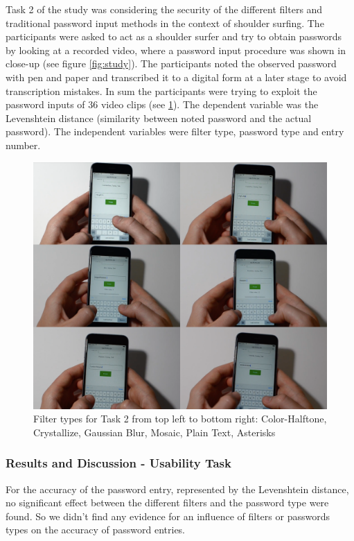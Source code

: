 \documentclass{sigchi}
\begin{document}
Task 2 of the study was considering the security of the different filters and traditional password input methods in the context of shoulder surfing. The participants were asked to act as a shoulder surfer and try to obtain passwords by looking at a recorded video, where a password input procedure was shown in close-up (see figure \ref{fig:study}). The participants noted the observed password with pen and paper and transcribed it to a digital form at a later stage to avoid transcription mistakes. In sum the participants were trying to exploit the password inputs of 36 video clips (see \ref{fig:filters_study_part2}). The dependent variable was the Levenshtein distance (similarity between noted password and the actual password). The independent variables were filter type, password type and entry number.

\begin{figure}[h]
    \centering
    \includegraphics[width=\columnwidth]{figures/filters_study_part2.png}
    \caption{Filter types for Task 2 from top left to bottom right: Color-Halftone, Crystallize, Gaussian Blur, Mosaic, Plain Text, Asterisks}
    \label{fig:filters_study_part2}
    \vspace{-7mm}
\end{figure}

\subsubsection{Results and Discussion - Usability Task}
For the accuracy of the password entry, represented by the Levenshtein distance, no significant effect between the different filters and the password type were found. So we didn't find any evidence for an influence of filters or passwords types on the accuracy of password entries. 
\end{document}
